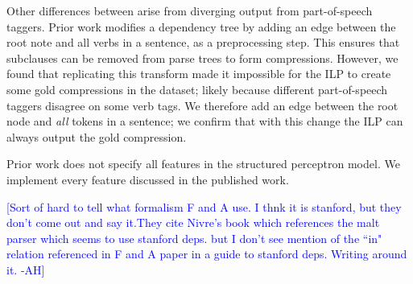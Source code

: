 \documentclass[11pt,a4paper]{article}
\newcommand{\ahcomment}[1]{\textcolor{blue}{[#1 -AH]}}
\begin{document}
Other differences between arise from diverging output from part-of-speech taggers. Prior work modifies a dependency tree by adding an edge between the root note and all verbs in a sentence, as a preprocessing step. This ensures that subclauses can be removed from parse trees to form compressions. However, we found that replicating this transform made it impossible for the ILP to create some gold compressions in the \citet{filippova2013overcoming} dataset; likely because different part-of-speech taggers disagree on some verb tags. We therefore add an edge between the root node and \textit{all} tokens in a sentence; we confirm that with this change the ILP can always output the gold compression.

Prior work does not specify all features in the structured perceptron model. We implement every feature discussed in the published work.

\ahcomment{Sort of hard to tell what formalism F and A use. I thnk it is stanford, but they don't come out and say it.They cite Nivre's book which references the malt parser which seems to use stanford deps. but I don't see mention of the ``in" relation referenced in F and A paper in a guide to stanford deps. Writing around it.}



\end{document}
